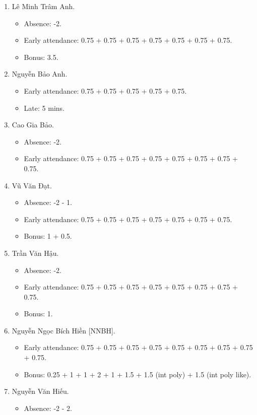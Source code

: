 \documentclass{article}
\begin{document}
\begin{enumerate}
	\item {\sc Lê Minh Trâm Anh.}
	\begin{itemize}
		\item Absence: -2.
		\item Early attendance: 0.75 + 0.75 + 0.75 + 0.75 + 0.75 + 0.75 + 0.75.
		\item Bonus: 3.5. 
	\end{itemize}
	\item {\sc Nguyễn Bảo Anh.}
	\begin{itemize}
		\item Early attendance: 0.75  + 0.75 + 0.75 + 0.75 + 0.75.
		\item Late: 5 mins.
	\end{itemize}
	\item {\sc Cao Gia Bảo.}
	\begin{itemize}
		\item Absence: -2.
		\item Early attendance: 0.75 + 0.75 + 0.75 + 0.75 + 0.75 + 0.75 + 0.75 + 0.75.
	\end{itemize}
	\item {\sc Vũ Văn Đạt.}
	\begin{itemize}
		\item Absence: -2 - 1.
		\item Early attendance: 0.75 + 0.75 + 0.75 + 0.75 + 0.75 + 0.75 + 0.75.
		\item Bonus: 1 + 0.5.
	\end{itemize}
	\item {\sc Trần Văn Hậu.}
	\begin{itemize}
		\item Absence: -2.
		\item Early attendance: 0.75 + 0.75 + 0.75 + 0.75 + 0.75 + 0.75 + 0.75 + 0.75.
		\item Bonus: 1.
	\end{itemize}
	\item {\sc Nguyễn Ngọc Bích Hiền [NNBH].}
	\begin{itemize}
		\item Early attendance: 0.75 + 0.75 + 0.75 + 0.75 + 0.75 + 0.75 + 0.75 + 0.75 + 0.75.
		\item Bonus: 0.25 + 1 + 1 + 2 + 1 + 1.5 + 1.5 (int poly) + 1.5 (int poly like).
	\end{itemize}
	\item {\sc Nguyễn Văn Hiếu.}
	\begin{itemize}
		\item Absence: -2 - 2.

\end{itemize}
\end{enumerate}
\end{document}
